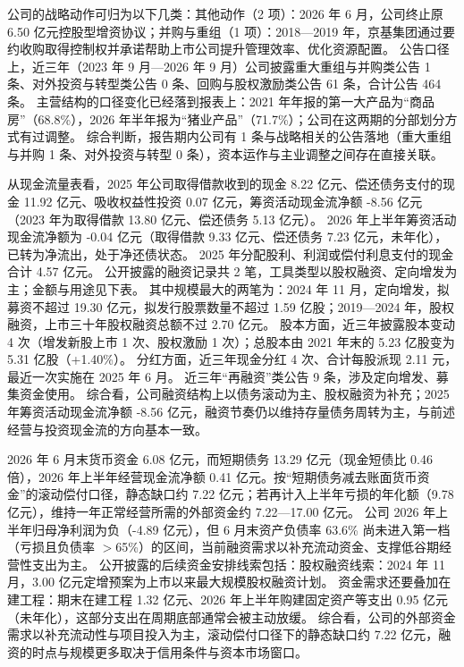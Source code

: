  公司的战略动作可归为以下几类：其他动作（2 项）：2026 年 6 月，公司终止原 6.50 亿元控股型增资协议；并购与重组（1 项）：2018---2019 年，京基集团通过要约收购取得控制权并承诺帮助上市公司提升管理效率、优化资源配置。 公告口径上，近三年（2023 年 9 月---2026 年 9 月）公司披露重大重组与并购类公告 1 条、对外投资与转型类公告 0 条、回购与股权激励类公告 61 条，合计公告 464 条。 主营结构的口径变化已经落到报表上：2021 年年报的第一大产品为“商品房”（68.8\%），2026 年半年报为“猪业产品”（71.7\%）；公司在这两期的分部划分方式有过调整。 综合判断，报告期内公司有 1 条与战略相关的公告落地（重大重组与并购 1 条、对外投资与转型 0 条），资本运作与主业调整之间存在直接关联。

 从现金流量表看，2025 年公司取得借款收到的现金 8.22 亿元、偿还债务支付的现金 11.92 亿元、吸收权益性投资 0.07 亿元，筹资活动现金流净额 -8.56 亿元（2023 年为取得借款 13.80 亿元、偿还债务 5.13 亿元）。 2026 年上半年筹资活动现金流净额为 -0.04 亿元（取得借款 9.33 亿元、偿还债务 7.23 亿元，未年化），已转为净流出，处于净还债状态。 2025 年分配股利、利润或偿付利息支付的现金合计 4.57 亿元。 公开披露的融资记录共 2 笔，工具类型以股权融资、定向增发为主；金额与用途见下表。 其中规模最大的两笔为：2024 年 11 月，定向增发，拟募资不超过 19.30 亿元，拟发行股票数量不超过 1.59 亿股；2019---2024 年，股权融资，上市三十年股权融资总额不过 2.70 亿元。 股本方面，近三年披露股本变动 4 次（增发新股上市 1 次、股权激励 1 次）；总股本由 2021 年末的 5.23 亿股变为 5.31 亿股（+1.40\%）。 分红方面，近三年现金分红 4 次、合计每股派现 2.11 元，最近一次实施在 2025 年 6 月。 近三年“再融资”类公告 9 条，涉及定向增发、募集资金使用。 综合看，公司融资结构上以债务滚动为主、股权融资为补充；2025 年筹资活动现金流净额 -8.56 亿元，融资节奏仍以维持存量债务周转为主，与前述经营与投资现金流的方向基本一致。

 2026 年 6 月末货币资金 6.08 亿元，而短期债务 13.29 亿元（现金短债比 0.46 倍），2026 年上半年经营现金流净额 0.41 亿元。按“短期债务减去账面货币资金”的滚动偿付口径，静态缺口约 7.22 亿元；若再计入上半年亏损的年化额（9.78 亿元），维持一年正常经营所需的外部资金约 7.22---17.00 亿元。 公司 2026 年上半年归母净利润为负（-4.89 亿元），但 6 月末资产负债率 63.6\% 尚未进入第一档（亏损且负债率 $>$65\%）的区间，当前融资需求以补充流动资金、支撑低谷期经营性支出为主。 公开披露的后续资金安排线索包括：股权融资线索：2024 年 11 月，3.00 亿元定增预案为上市以来最大规模股权融资计划。 资金需求还要叠加在建工程：期末在建工程 1.32 亿元、2026 年上半年购建固定资产等支出 0.95 亿元（未年化），这部分支出在周期底部通常会被主动放缓。 综合看，公司的外部资金需求以补充流动性与项目投入为主，滚动偿付口径下的静态缺口约 7.22 亿元，融资的时点与规模更多取决于信用条件与资本市场窗口。




